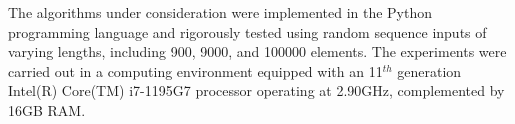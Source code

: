 \documentclass[article,10pt]{article}
\begin{document}
\begin{multicols}{2}

The algorithms under consideration were implemented in the Python programming language and rigorously tested using random sequence inputs of varying lengths, including 900, 9000, and 100000 elements. The experiments were carried out in a computing environment equipped with an 11$^{th}$ generation Intel(R) Core(TM) i7-1195G7 processor operating at 2.90GHz, complemented by 16GB RAM.\\

\noindent


\end{multicols}
\end{document}
